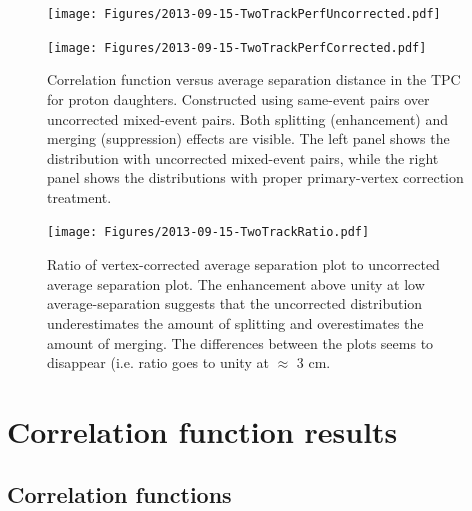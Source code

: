 

\begin{figure}[h]
\begin{minipage}{18pc}
\texttt{[image: Figures/2013-09-15-TwoTrackPerfUncorrected.pdf]}
\end{minipage}\hspace{2pc}
\begin{minipage}{18pc}
\texttt{[image: Figures/2013-09-15-TwoTrackPerfCorrected.pdf]}
\end{minipage} 
\caption[Two-track reconstruction effects]{\label{fig:TwoTrackPerf}Correlation function versus average separation distance in the TPC for proton daughters.  Constructed using same-event pairs over uncorrected mixed-event pairs.  Both splitting (enhancement) and merging (suppression) effects are visible. The left panel shows the distribution with uncorrected mixed-event pairs, while the right panel shows the distributions with proper primary-vertex correction treatment.}
\end{figure}

\begin{figure}[hbtp]
\texttt{[image: Figures/2013-09-15-TwoTrackRatio.pdf]}
\caption[Ratio of corrected/uncorrected average-separation distributions]{Ratio of vertex-corrected average separation plot to uncorrected average separation plot.  The enhancement above unity at low average-separation suggests that the uncorrected distribution underestimates the amount of splitting and overestimates the amount of merging.  The differences between the plots seems to disappear (i.e. ratio goes to unity at $\approx$ 3 cm.}
\label{fig:TwoTrackRatio}
\end{figure}

\section{Correlation function results}
\subsection{Correlation functions}
\label{sec:RawCorrelationFunctions}

